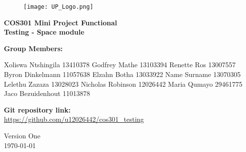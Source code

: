 \begin{titlepage}
	\begin{center}
		
		\begin{figure}[t]
			\centering
			\texttt{[image: UP\_Logo.png]}
		\end{figure}		
		
		\textbf{\LARGE COS301 Mini Project Functional \\Testing - Space module\\}
		
		\vspace{1 cm}
		
		\LARGE{\textbf{Group Members: }}
		

		\begin{flushright} \large
			Xoliswa Ntshingila 13410378\newline
			Godfrey Mathe 13103394 \newline
			Renette Ros 13007557\newline
			Byron Dinkelmann 11057638\newline
			Elzahn Botha 13033922\newline
			Name Surname 13070305\newline
			Lelethu Zazaza 13028023\newline
			Nicholas Robinson 12026442\newline
			Maria Qumayo 29461775\newline
			Jaco Bezuidenhout 11013878\newline
		\end{flushright}
		
	
		
		\textbf{Git repository link:\\}
		 \url{ https://github.com/u12026442/cos301_testing}
		
		\vfill
		
		{\LARGE Version One}
		\\
		{\large \today}		
		
		
	\end{center}
\end{titlepage}
